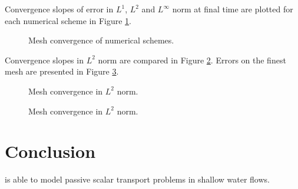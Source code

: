 Convergence slopes of error in $L^1$, $L^2$ and $L^\infty$ norm at final time
are plotted for each numerical scheme in Figure
\ref{t2d:flumetracer:mesh_convergence}.

\begin{figure}[h!]
\begin{minipage}[t]{0.50\textwidth}
 \centering
\end{minipage}
\begin{minipage}[t]{0.50\textwidth}
 \centering
\end{minipage}
\begin{minipage}[t]{0.50\textwidth}
 \centering
\end{minipage}
\begin{minipage}[t]{0.50\textwidth}
 \centering
\end{minipage}
\begin{minipage}[t]{0.50\textwidth}
 \centering
\end{minipage}
\begin{minipage}[t]{0.50\textwidth}
 \centering
\end{minipage}
 \caption{Mesh convergence of numerical schemes.}
 \label{t2d:flumetracer:mesh_convergence}
\end{figure}

Convergence slopes in $L^2$ norm are compared in Figure
\ref{t2d:flumetracer:error_slopes_allvars}.
Errors on the finest mesh are presented in Figure
\ref{t2d:flumetracer:error_finemesh}.

\begin{figure}[h!]
\centering
{}
\caption{Mesh convergence in $L^2$ norm.}
\label{t2d:flumetracer:error_slopes_allvars}
\end{figure}

\begin{figure}[h!]
\centering
{}
\caption{Mesh convergence in $L^2$ norm.}
\label{t2d:flumetracer:error_finemesh}
\end{figure}


\section{Conclusion}
 is able to model passive scalar transport problems in shallow water flows.
